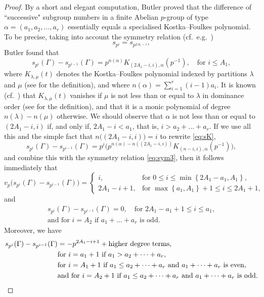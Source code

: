 \documentclass[12pt,reqno]{amsart}
\numberwithin{equation}{section}
\theoremstyle{remark}
\begin{document}
\begin{proof}
By a short and elegant computation, Butler \cite[display on top of
p.~773]{ButlAA} proved that the difference of ``successive" subgroup
numbers in a finite Abelian $p$-group of type ${\alpha}
=(a_1,a_2,\dots,a_r)$ essentially equals a specialised Kostka--Foulkes
polynomial. To be precise, taking into account the symmetry relation
(cf.\ e.g.\ \cite[p.~181, Statement~(1.5)]{MacdAC})
\begin{equation} \label{eq:sym3} 
s_{p^i}=s_{p^{2A_1-i}},
\end{equation} 
Butler found that
\begin{equation} \label{eq:sK} 
s_{p^i}({\Gamma})-s_{p^{i-1}}({\Gamma})=
p^{n({\alpha})}K_{(2A_1-i,i),{\alpha}}(p^{-1}),
\quad \text{for $i\le A_1$},
\end{equation}
where $K_{{\lambda},\mu}(t)$ denotes the Kostka--Foulkes polynomial indexed by
partitions ${\lambda}$ and $\mu$ (see \cite[Ch.~III, Sec.~6]{MacdAC} for the
definition), and where $n({\alpha})=\sum_{i=1}^r(i-1)a_i$.
It is known (cf.\ \cite[Statement~(6.5)(ii) on p.~243]{MacdAC}) 
that $K_{{\lambda},\mu}(t)$ vanishes if $\mu$ is not less than or equal to ${\lambda}$
in dominance order (see \cite[p.~7]{MacdAC} for the definition),
and that it is a monic polynomial of degree
$n({\lambda})-n(\mu)$ otherwise. 
We should observe that ${\alpha}$ is not less
than or equal to $(2A_1-i,i)$ if, and only if, $2A_1-i<a_1$, that is,
$i>a_2+\dots+a_r$. 
If we use all this and the simple fact that
$n\big((2A_1-i,i)\big)=i$ to rewrite \eqref{eq:sK},
$$
s_{p^i}({\Gamma})-s_{p^{i-1}}({\Gamma})=
p^{i}\big(p^{n({\alpha})-n((2A_1-i,i))}K_{(n-i,i),{\alpha}}(p^{-1})\big),
$$
and combine this with the symmetry relation \eqref{eq:sym3},
then it follows immediately that 
\begin{equation} \label{eq:diff1}
v_p\big(s_{p^i}({\Gamma})-s_{p^{i-1}}({\Gamma})\big)=
\begin{cases}
i,&\text{for }0\le i\le \min\left\{2A_1-a_1,A_1\right\},\\
2A_1-i+1,&\text{for }\max\left\{a_1,A_1\right\}+1\le i\le 2A_1+1,
\end{cases}
\end{equation}
and
\begin{multline} \label{eq:diff1b}
s_{p^i}({\Gamma})-s_{p^{i-1}}({\Gamma})=0,\quad 
\text{for } 2A_1-a_1+1\le i\le a_1,\\
\text{and for }i=A_2\text{ if $a_1+\dots+a_r$ is odd.}
\end{multline}
Moreover, we have
\begin{align} 
\notag
s_{p^i}({\Gamma})-s_{p^{i-1}}({\Gamma})&=-p^{2A_1-i+1}+\text{higher degree terms},\\
\notag
&\text{for } i=a_1+1\text{ if }a_1>a_2+\dots+a_r,\\
\notag
&\text{for }i=A_1+1\text{ if $a_1\le a_2+\dots+a_r$ and
$a_1+\dots+a_r$ is even, }\\
&\text{and for }i=A_2+1\text{ if $a_1\le a_2+\dots+a_r$ and
$a_1+\dots+a_r$ is odd.}
\label{eq:diff1c}
\end{align}


\end{proof}
\end{document}
